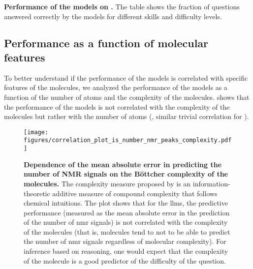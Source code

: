 \begin{table}
    \caption{\textbf{Performance of the models on \chembenchmini.} The table shows the fraction of questions answered correctly by the models for different skills and difficulty levels.}
    \label{tab:performance_table_human_subset}
\end{table}




\clearpage

\subsection{Performance as a function of molecular features} \label{sec:molecular_features}
To better understand if the performance of the models is correlated with specific features of the molecules, we analyzed the performance of the models as a function of the number of atoms and the complexity of the molecules.
 shows that the performance of the models is not correlated with the complexity of the molecules but rather with the number of atoms (, similar trivial correlation for ).

\begin{figure}[!h]
    \centering
    \texttt{[image: figures/correlation\_plot\_is\_number\_nmr\_peaks\_complexity.pdf]}
    \caption{\textbf{Dependence of the mean absolute error in predicting the number of NMR signals on the Böttcher complexity of the molecules.} The complexity measure proposed by \textcite{B_ttcher_2016} is an information-theoretic additive measure of compound complexity that follows chemical intuitions.
    The plot shows that for the \glspl{llm}, the predictive performance (measured as the mean absolute error in the prediction of the number of \gls{nmr} signals) is not correlated with the complexity of the molecules (that is, molecules tend to not to be able to predict the number of \gls{nmr} signals regardless of molecular complexity). For inference based on reasoning, one would expect that the complexity of the molecule is a good predictor of the difficulty of the question.}
    \label{fig:correlation_plot_is_number_nmr_peaks_complexity}
\end{figure}

